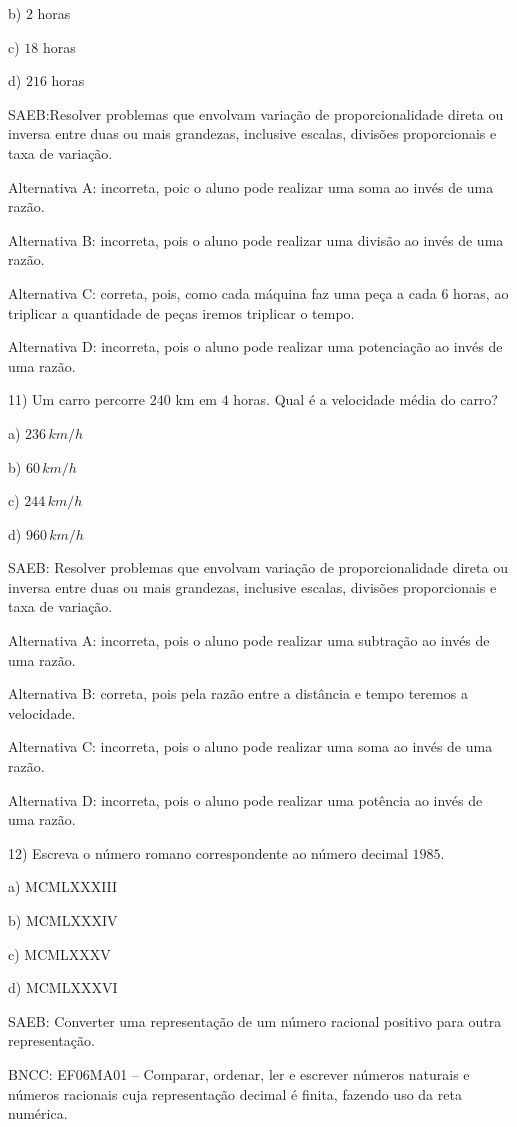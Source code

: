 b) $2$ horas

c) $18$ horas

d) $216$ horas

SAEB:Resolver problemas que envolvam variação de proporcionalidade
direta ou inversa entre duas ou mais grandezas, inclusive escalas,
divisões proporcionais e taxa de variação.

Alternativa A: incorreta, poic o aluno pode realizar uma soma ao invés
de uma razão.

Alternativa B: incorreta, pois o aluno pode realizar uma divisão ao
invés de uma razão.

Alternativa C: correta, pois, como cada máquina faz uma peça a cada $6$
horas, ao triplicar a quantidade de peças iremos triplicar o tempo.

Alternativa D: incorreta, pois o aluno pode realizar uma potenciação ao
invés de uma razão.

11) Um carro percorre $240$ km em $4$ horas. Qual é a velocidade média do
carro?

a) $236\,km/h$

b) $60\,km/h$

c) $244\,km/h$

d) $960\,km/h$

SAEB: Resolver problemas que envolvam variação de proporcionalidade
direta ou inversa entre duas ou mais grandezas, inclusive escalas,
divisões proporcionais e taxa de variação.

Alternativa A: incorreta, pois o aluno pode realizar uma subtração ao
invés de uma razão.

Alternativa B: correta, pois pela razão entre a distância e tempo
teremos a velocidade.

Alternativa C: incorreta, pois o aluno pode realizar uma soma ao invés
de uma razão.

Alternativa D: incorreta, pois o aluno pode realizar uma potência ao
invés de uma razão.

12) Escreva o número romano correspondente ao número decimal $1985$.

a) MCMLXXXIII

b) MCMLXXXIV

c) MCMLXXXV

d) MCMLXXXVI

SAEB: Converter uma representação de um número racional positivo para
outra representação.

BNCC: EF06MA01 -- Comparar, ordenar, ler e escrever números naturais e
números racionais cuja representação decimal é finita, fazendo uso da
reta numérica.

